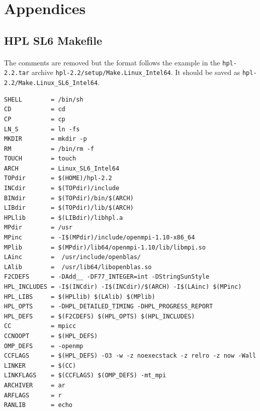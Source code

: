 \documentclass{article}
\newenvironment{code}{\captionsetup{type=listing}}{}
\begin{document}
\printbibliography[title={Sources}]






































\appendix
    \section*{Appendices}
    \renewcommand{\thesubsection}{\Alph{subsection}}

    \subsection{HPL SL6 Makefile}
    \label{appendix:makefile}

    \paragraph{}
    The comments are removed but the format follows the example in the \verb|hpl-2.2.tar| archive \verb|hpl-2.2/setup/Make.Linux_Intel64|. It should be saved as \verb|hpl-2.2/Make.Linux_SL6_Intel64|.
        \begin{code}
        \label{code:builds-cloud-make-linux_sl6_intel64}
        \begin{verbatim}
SHELL        = /bin/sh
CD           = cd
CP           = cp
LN_S         = ln -fs
MKDIR        = mkdir -p
RM           = /bin/rm -f
TOUCH        = touch
ARCH         = Linux_SL6_Intel64
TOPdir       = $(HOME)/hpl-2.2
INCdir       = $(TOPdir)/include
BINdir       = $(TOPdir)/bin/$(ARCH)
LIBdir       = $(TOPdir)/lib/$(ARCH)
HPLlib       = $(LIBdir)/libhpl.a
MPdir        = /usr
MPinc        = -I$(MPdir)/include/openmpi-1.10-x86_64
MPlib        = $(MPdir)/lib64/openmpi-1.10/lib/libmpi.so
LAinc        =  /usr/include/openblas/
LAlib        =  /usr/lib64/libopenblas.so
F2CDEFS      = -DAdd__ -DF77_INTEGER=int -DStringSunStyle
HPL_INCLUDES = -I$(INCdir) -I$(INCdir)/$(ARCH) -I$(LAinc) $(MPinc)
HPL_LIBS     = $(HPLlib) $(LAlib) $(MPlib)
HPL_OPTS     = -DHPL_DETAILED_TIMING -DHPL_PROGRESS_REPORT
HPL_DEFS     = $(F2CDEFS) $(HPL_OPTS) $(HPL_INCLUDES)
CC           = mpicc
CCNOOPT      = $(HPL_DEFS)
OMP_DEFS     = -openmp
CCFLAGS      = $(HPL_DEFS) -O3 -w -z noexecstack -z relro -z now -Wall
LINKER       = $(CC)
LINKFLAGS    = $(CCFLAGS) $(OMP_DEFS) -mt_mpi
ARCHIVER     = ar
ARFLAGS      = r
RANLIB       = echo

        \end{verbatim}
        \end{code}
\end{document}
